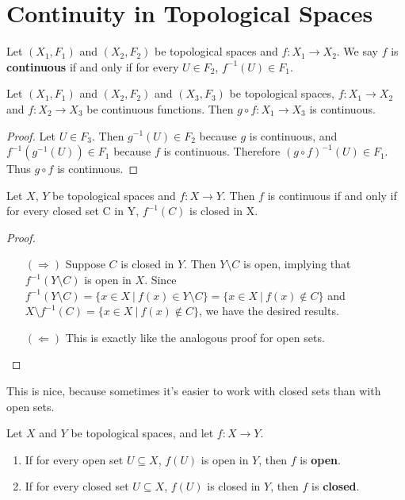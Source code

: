 

\section{Continuity in Topological Spaces} 
\begin{definition}
	Let $(X_1,F_1)$ and $(X_2,F_2)$ be topological spaces and $f: X_1 \to X_2$. We say $f$ is \textbf{continuous} if and only if for every $U \in F_2$, $f^{-1}(U)\in F_1$. 
\end{definition}
\begin{smallfact}
	Let $(X_1,F_1)$ and $(X_2,F_2)$ and $(X_3,F_3)$ be topological spaces, $f: X_1 \to X_2$ and $f: X_2 \to X_3$ be continuous functions. Then $g \circ f: X_1 \to X_3$ is continuous. 
\end{smallfact}
\begin{proof}
	Let $U \in F_3$. Then $g^{-1}(U) \in F_2$ because $g$ is continuous, and $f^{-1}(g^{-1}(U)) \in F_1$ because $f$ is continuous. Therefore $(g \circ f)^{-1}(U) \in F_1$. Thus $g\circ f$ is continuous. 
\end{proof}
\begin{theorem}
	Let $X$, $Y$ be topological spaces and $f: X \to Y$. Then $f$ is continuous if and only if for every closed set C in Y, $f^{-1}(C)$ is closed in X. 
\end{theorem}
\begin{proof}
	\begin{itemize}
		\item [$(\Rightarrow)$] Suppose $C$ is closed in $Y$. Then $Y\setminus C$ is open, implying that $f^{-1}(Y\setminus C)$ is open in $X$. Since $f^{-1}(Y\setminus C)= \{ x \in X\ |\ f(x) \in Y\setminus C\} = \{ x \in X\ |\ f(x) \notin C \}$ and $X\setminus f^{-1}(C)= \{ x \in X\ |\ f(x) \notin C \}$, we have the desired results. 
		\item [$(\Leftarrow)$] This is exactly like the analogous proof for open sets. 
	\end{itemize}
\end{proof}

This is nice, because sometimes it's easier to work with closed sets than with open sets. 
\begin{definition}
	Let $X$ and $Y$ be topological spaces, and let $f:X\to Y$. 
	\begin{enumerate}
		\item If for every open set $U\subseteq X$, $f(U)$ is open in $Y$, then $f$ is \textbf{open}. 
		\item If for every closed set $U\subseteq X$, $f(U)$ is closed in $Y$, then $f$ is \textbf{closed}. 
	\end{enumerate}
\end{definition}

